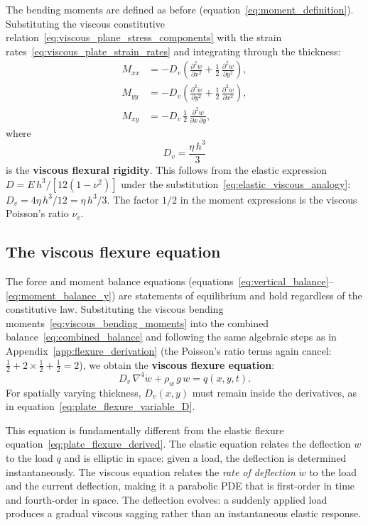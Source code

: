 \documentclass[11pt]{article}
\begin{document}
The bending moments are defined as before (equation~\eqref{eq:moment_definition}).  Substituting the viscous constitutive relation~\eqref{eq:viscous_plane_stress_components} with the strain rates~\eqref{eq:viscous_plate_strain_rates} and integrating through the thickness:
\begin{align}
  M_{xx} &= -D_v\!\left(\frac{\partial^2 \dot{w}}{\partial x^2} + \frac{1}{2}\,\frac{\partial^2 \dot{w}}{\partial y^2}\right), \nonumber \\[4pt]
  M_{yy} &= -D_v\!\left(\frac{\partial^2 \dot{w}}{\partial y^2} + \frac{1}{2}\,\frac{\partial^2 \dot{w}}{\partial x^2}\right), \nonumber \\[4pt]
  M_{xy} &= -D_v\,\frac{1}{2}\,\frac{\partial^2 \dot{w}}{\partial x\,\partial y},
  \label{eq:viscous_bending_moments}
\end{align}
where
\begin{equation}
  \boxed{D_v = \frac{\eta\,h^3}{3}}
  \label{eq:viscous_flexural_rigidity}
\end{equation}
is the \textbf{viscous flexural rigidity}.  This follows from the elastic expression $D = E\,h^3/[12(1-\nu^2)]$ under the substitution~\eqref{eq:elastic_viscous_analogy}: $D_v = 4\eta\,h^3/12 = \eta\,h^3/3$.  The factor $1/2$ in the moment expressions is the viscous Poisson's ratio $\nu_v$.

\subsection*{The viscous flexure equation}

The force and moment balance equations (equations~\eqref{eq:vertical_balance}--\eqref{eq:moment_balance_y}) are statements of equilibrium and hold regardless of the constitutive law.  Substituting the viscous bending moments~\eqref{eq:viscous_bending_moments} into the combined balance~\eqref{eq:combined_balance} and following the same algebraic steps as in Appendix~\ref{app:flexure_derivation} (the Poisson's ratio terms again cancel: $\frac{1}{2} + 2 \times \frac{1}{2} + \frac{1}{2} = 2$), we obtain the \textbf{viscous flexure equation}:
\begin{equation}
  \boxed{D_v\,\nabla^4 \dot{w} + \rho_w\,g\,w = q(x,y,t).}
  \label{eq:viscous_plate_flexure}
\end{equation}
For spatially varying thickness, $D_v(x,y)$ must remain inside the derivatives, as in equation~\eqref{eq:plate_flexure_variable_D}.

\medskip
\noindent This equation is fundamentally different from the elastic flexure equation~\eqref{eq:plate_flexure_derived}.  The elastic equation relates the deflection $w$ to the load $q$ and is elliptic in space: given a load, the deflection is determined instantaneously.  The viscous equation relates the \textit{rate of deflection} $\dot{w}$ to the load and the current deflection, making it a parabolic PDE that is first-order in time and fourth-order in space.  The deflection evolves: a suddenly applied load produces a gradual viscous sagging rather than an instantaneous elastic response.
\end{document}
